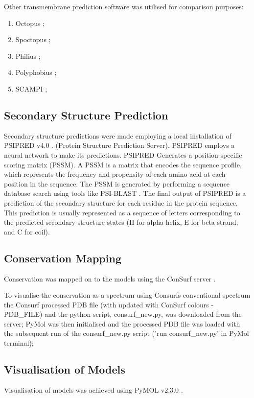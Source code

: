 Other transmembrane prediction software was utilised for comparison purposes:
\begin{enumerate}
\item Octopus \cite{viklund2008octopus};
\item Spoctopus \cite{teixeira2017membrane}; 
\item Philius \cite{reynolds2008transmembrane} ;
\item Polyphobius \cite{jones2007improving} ;
\item SCAMPI \cite{reeb2015evaluation};
\end{enumerate}

\subsection{Secondary Structure Prediction}
Secondary structure predictions were made employing a local installation of PSIPRED v4.0 \cite{McGuffin2000}. (Protein Structure Prediction Server). PSIPRED employs a  neural network to make its predictions. PSIPRED Generates a position-specific scoring matrix (PSSM). A PSSM is a matrix that encodes the sequence profile, which represents the frequency and propensity of each amino acid at each position in the sequence. The PSSM is generated by performing a sequence database search using tools like PSI-BLAST \cite{altschul1998iterated}. The final output of PSIPRED is a prediction of the secondary structure for each residue in the protein sequence. This prediction is usually represented as a sequence of letters corresponding to the predicted secondary structure states (H for alpha helix, E for beta strand, and C for coil).

\subsection{Conservation Mapping}
Conservation was mapped on to the models using the ConSurf server \cite{Ashkenazy2016}. 

To visualise the conservation as a spectrum using Consurfs conventional spectrum the Consurf processed PDB file (with updated with ConSurf colours - PDB\_FILE) and the python script, consurf\_new.py, was downloaded from the server; PyMol was then initialised and the processed PDB file was loaded with the subsequent run of the consurf\_new.py script ('run consurf\_new.py' in PyMol terminal);


\subsection{Visualisation of Models}
Visualisation of models was achieved using PyMOL v2.3.0 \cite{DeLano2002}.

